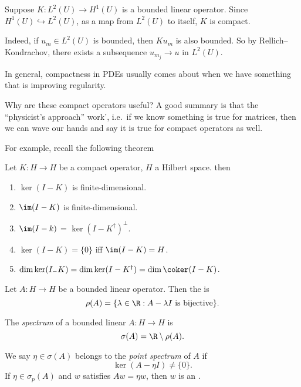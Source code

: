 \documentclass[a4paper]{article}
\begin{document}
\begin{eg}
  Suppose $K: L^2(U) \to H^1(U)$ is a bounded linear operator. Since $H^1(U) \hookrightarrow L^2(U)$, as a map from $L^2(U)$ to itself, $K$ is compact.

  Indeed, if $u_m \in L^2(U)$ is bounded, then $K u_m$ is also bounded. So by Rellich--Kondrachov, there exists a subsequence $u_{m_j} \to u$ in $L^2(U)$.
\end{eg}

In general, compactness in PDEs usually comes about when we have something that is improving regularity.

Why are these compact operators useful? A good summary is that the ``physicist's approach'' work', i.e.\ if we know something is true for matrices, then we can wave our hands and say it is true for compact operators as well.

For example, recall the following theorem
\begin{thm}
  Let $K: H \to H$ be a compact operator, $H$ a Hilbert space. then
  \begin{enumerate}
    \item $\ker (I - K)$ is finite-dimensional.
    \item $\im (I - K)$ is finite-dimensional.
    \item $\im (I - k)$ = $\ker (I - K^\dagger)^\perp$.
    \item $\ker (I - K) = \{0\}$ iff $\im (I - K) = H$.
    \item $\dim \ker (I _- K) = \dim \ker (I - K^\dagger) = \dim \coker (I - K)$.
  \end{enumerate}
\end{thm}

\begin{defi}
  Let $A: H \to H$ be a bounded linear operator. Then the  is
  \[
    \rho(A) = \{\lambda \in \R: A - \lambda I\text{ is bijective}\}.
  \]
\end{defi}

\begin{defi}[Spectrum]
  The \emph{spectrum} of a bounded linear $A: H \to H$ is
  \[
    \sigma(A) = \R \setminus \rho(A).
  \]
\end{defi}

\begin{defi}
  We say $\eta \in \sigma (A)$ belongs to the \emph{point spectrum} of $A$ if
  \[
    \ker (A - \eta I) \not= \{0\}.
  \]
  If $\eta \in \sigma_p(A)$ and $w$ satisfies $A w = \eta w$, then $w$ is an .
\end{defi}
\end{document}
